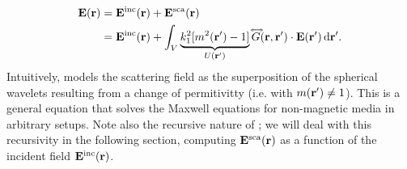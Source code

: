 \begin{align}
\mathbf{E}(\mathbf{r}) & = \mathbf{E}^\text{inc}(\mathbf{r})+\mathbf{E}^\text{sca}(\mathbf{r}) \nonumber\\
&=\mathbf{E}^\text{inc}(\mathbf{r}) + \int_V \underbrace{k_1^2 [m^2(\mathbf{r}')-1]}_{U(\mathbf{r}')} \accentset{\Longleftrightarrow}{G}(\mathbf{r},\mathbf{r}') \cdot \mathbf{E}(\mathbf{r}') \,\text{d}\mathbf{r}'.
\label{eq:vri}
\end{align}
Intuitively,  models the scattering field as the superposition of the spherical wavelets resulting from a change of permitivitty (i.e. with $m(\mathbf{r}')\neq1$). This is a general equation that solves the Maxwell equations for non-magnetic media in arbitrary setups. Note also the recursive nature of ; we will deal with this recursivity in the following section, computing $\mathbf{E}^\text{sca}(\mathbf{r})$ as a function of the incident field $\mathbf{E}^\text{inc}(\mathbf{r})$. 


